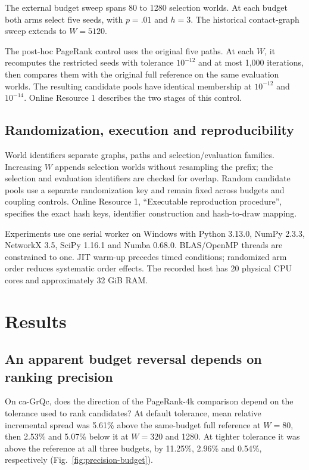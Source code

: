 \documentclass[smallextended]{svjour3}
\begin{document}
The external budget sweep spans 80 to 1280 selection worlds. At each budget both arms select five seeds, with $p=.01$ and $h=3$. The historical contact-graph sweep extends to $W=5120$.

The post-hoc PageRank control uses the original five paths. At each $W$, it recomputes the restricted seeds with tolerance $10^{-12}$ and at most 1,000 iterations, then compares them with the original full reference on the same evaluation worlds. The resulting candidate pools have identical membership at $10^{-12}$ and $10^{-14}$. Online Resource 1 describes the two stages of this control.

\subsection{Randomization, execution and reproducibility}
World identifiers separate graphs, paths and selection/evaluation families. Increasing $W$ appends selection worlds without resampling the prefix; the selection and evaluation identifiers are checked for overlap. Random candidate pools use a separate randomization key and remain fixed across budgets and coupling controls. Online Resource 1, ``Executable reproduction procedure'', specifies the exact hash keys, identifier construction and hash-to-draw mapping.

Experiments use one serial worker on Windows with Python 3.13.0, NumPy 2.3.3, NetworkX 3.5, SciPy 1.16.1 and Numba 0.68.0. BLAS/OpenMP threads are constrained to one. JIT warm-up precedes timed conditions; randomized arm order reduces systematic order effects. The recorded host has 20 physical CPU cores and approximately 32 GiB RAM.

\section{Results}
\subsection{An apparent budget reversal depends on ranking precision}
On ca-GrQc, does the direction of the PageRank-4k comparison depend on the tolerance used to rank candidates? At default tolerance, mean relative incremental spread was 5.61\% above the same-budget full reference at $W=80$, then 2.53\% and 5.07\% below it at $W=320$ and 1280. At tighter tolerance it was above the reference at all three budgets, by 11.25\%, 2.96\% and 0.54\%, respectively (Fig.~\ref{fig:precision-budget}).
\end{document}
